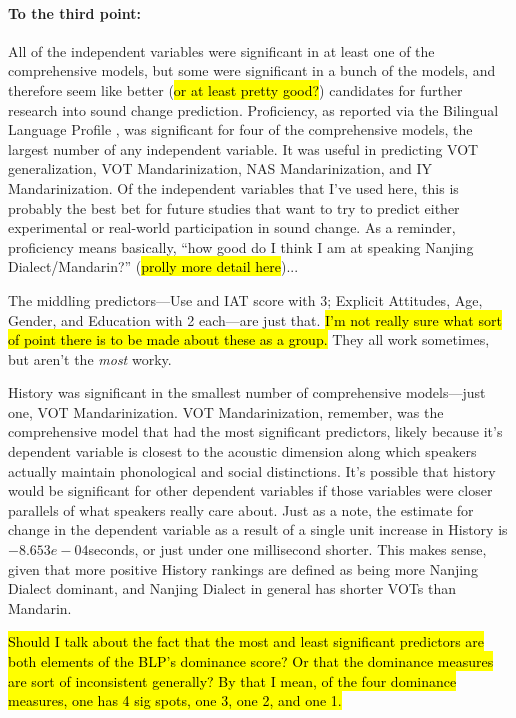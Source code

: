 \paragraph{To the third point:}
All of the independent variables were significant in at least one of the comprehensive models, but some were significant in a bunch of the models, and therefore seem like better (\hl{or at least pretty good?}) candidates for further research into sound change prediction. Proficiency, as reported via the Bilingual Language Profile \citep{birdsong2012bilingual, gertken2014assessing}, was significant for four of the comprehensive models, the largest number of any independent variable. It was useful in predicting VOT generalization, VOT Mandarinization, NAS Mandarinization, and IY Mandarinization. Of the independent variables that I've used here, this is probably the best bet for future studies that want to try to predict either experimental or real-world participation in sound change. As a reminder, proficiency means basically, ``how good do I think I am at speaking Nanjing Dialect/Mandarin?'' (\hl{prolly more detail here})...

The middling predictors---Use and IAT score with 3; Explicit Attitudes, Age, Gender, and Education with 2 each---are just that. \hl{I'm not really sure what sort of point there is to be made about these as a group.} They all work sometimes, but aren't the \emph{most} worky.

History was significant in the smallest number of comprehensive models---just one, VOT Mandarinization. VOT Mandarinization, remember, was the comprehensive model that had the most significant predictors, likely because it's dependent variable is closest to the acoustic dimension along which speakers actually maintain phonological and social distinctions. It's possible that history would be significant for other dependent variables if those variables were closer parallels of what speakers really care about. Just as a note, the estimate for change in the dependent variable as a result of a single unit increase in History is $-8.653e-04$seconds, or just under one millisecond shorter. This makes sense, given that more positive History rankings are defined as being more Nanjing Dialect dominant, and Nanjing Dialect in general has shorter VOTs than Mandarin.

\hl{Should I talk about the fact that the most and least significant predictors are both elements of the BLP's dominance score? Or that the dominance measures are sort of inconsistent generally? By that I mean, of the four dominance measures, one has 4 sig spots, one 3, one 2, and one 1.}


